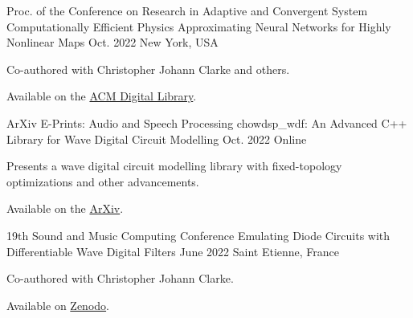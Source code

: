 

\begin{cventries}

  \cventry
    {Proc. of the Conference on Research in Adaptive and Convergent System} %
    {Computationally Efficient Physics Approximating Neural Networks for Highly Nonlinear Maps} %
    {Oct. 2022} %
    {New York, USA} %
    {
      \begin{cvitems} %
        \item {Co-authored with Christopher Johann Clarke and others.}
        \item {Available on the \href{https://dl.acm.org/doi/10.1145/3538641.3561501}{ACM Digital Library}.}
      \end{cvitems}
    }

  \cventry
    {ArXiv E-Prints: Audio and Speech Processing} %
    {chowdsp\_wdf: An Advanced C++ Library for Wave Digital Circuit Modelling} %
    {Oct. 2022} %
    {Online} %
    {
      \begin{cvitems} %
        \item {Presents a wave digital circuit modelling library with fixed-topology optimizations and other advancements.}
        \item {Available on the \href{https://arxiv.org/abs/2210.12554}{ArXiv}.}
      \end{cvitems}
    }


  \cventry
    {19th Sound and Music Computing Conference} %
    {Emulating Diode Circuits with Differentiable Wave Digital Filters} %
    {June 2022} %
    {Saint Etienne, France} %
    {
      \begin{cvitems} %
        \item {Co-authored with Christopher Johann Clarke.}
        \item {Available on \href{https://zenodo.org/record/6566846}{Zenodo}.}
      \end{cvitems}
    }



\end{cventries}
